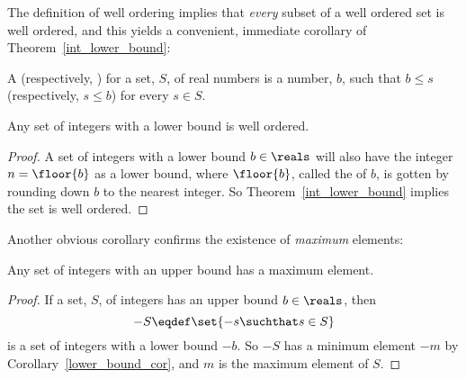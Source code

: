 The definition of well ordering implies that \emph{every} subset of a
well ordered set is well ordered, and this yields a convenient,
immediate corollary of Theorem~\ref{int_lower_bound}:

\begin{definition}
A  (respectively, ) for a set,
$S$, of real numbers is a number, $b$, such that $b \leq s$
(respectively, $s \leq b$) for every $s \in S$.
\end{definition}

\begin{corollary}\label{lower_bound_cor}
Any set of integers with a lower bound is well ordered.
\end{corollary}

\begin{proof}
A set of integers with a lower bound $b \in \reals$ will also have the
integer $n = \floor{b}$ as a lower bound, where $\floor{b}$, called
the  of $b$, is gotten by rounding down $b$ to the nearest
integer.  So Theorem~\ref{int_lower_bound} implies the set is well
ordered.
\end{proof}

Another obvious corollary confirms the existence of \emph{maximum} elements:

\begin{corollary}\label{upper_bound_cor}
Any set of integers with an upper bound has a maximum element.
\end{corollary}

\begin{proof}
If a set, $S$, of integers has an upper bound $b \in \reals$, then
\[
- S \eqdef \set{ - s \suchthat s \in S}
\]
is a set of integers with a lower bound $-b$.  So $-S$ has a minimum
element $-m$ by Corollary~\ref{lower_bound_cor}, and $m$ is the
maximum element of $S$.
\end{proof}

\begin{problems}
  \practiceproblems

  \classproblems

\end{problems}
\endinput


